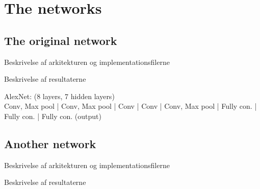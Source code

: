 \graphicspath{{Chapters/Project/}}

\section{The networks} %
\label{sec:the_networks}

\subsection{The original network} %
\label{sub:the_original_network}

Beskrivelse af arkitekturen og implementationsfilerne

Beskrivelse af resultaterne


AlexNet: (8 layers, 7 hidden layers) \\
 Conv, Max pool | Conv, Max pool | Conv | Conv | Conv, Max pool |
Fully con. | Fully con. | Fully con. (output) 



\subsection{Another network} %
\label{sub:another_network}

Beskrivelse af arkitekturen og implementationsfilerne

Beskrivelse af resultaterne


